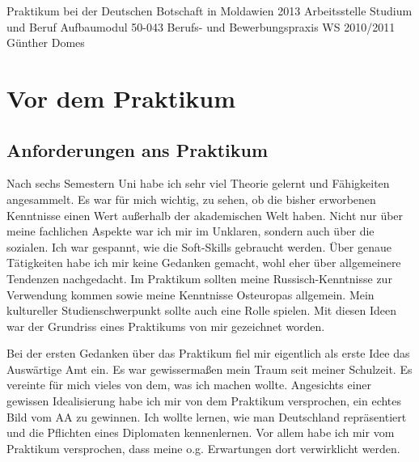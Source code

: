 \documentclass{../../sem_paper}
\begin{document}
\titlepg
{Praktikum bei der Deutschen Botschaft in Moldawien}
{2013}
{Arbeitsstelle Studium und Beruf}
{Aufbaumodul 50-043 Berufs- und Bewerbungspraxis}
{WS 2010/2011}
{Günther Domes}

\tocpaper

\section{Vor dem Praktikum}

\subsection{Anforderungen ans Praktikum}
Nach sechs Semestern Uni habe ich sehr viel Theorie gelernt und Fähigkeiten angesammelt. Es war für mich wichtig, zu sehen, ob die bisher erworbenen Kenntnisse einen Wert außerhalb der akademischen Welt haben. Nicht nur über meine fachlichen Aspekte war ich mir im Unklaren, sondern auch über die sozialen. Ich war gespannt, wie die Soft-Skills gebraucht werden.
Über genaue Tätigkeiten habe ich mir keine Gedanken gemacht, wohl eher über allgemeinere Tendenzen nachgedacht. Im Praktikum sollten meine Russisch-Kenntnisse zur Verwendung kommen sowie meine Kenntnisse Osteuropas allgemein. Mein kultureller Studienschwerpunkt sollte auch eine Rolle spielen. Mit diesen Ideen war der Grundriss eines Praktikums von mir gezeichnet worden.

Bei der ersten Gedanken über das Praktikum fiel mir eigentlich als erste Idee das Auswärtige Amt ein. Es war gewissermaßen mein Traum seit meiner Schulzeit. Es vereinte für mich vieles von dem, was ich machen wollte. Angesichts einer gewissen Idealisierung habe ich mir von dem Praktikum versprochen, ein echtes Bild vom AA zu gewinnen. Ich wollte lernen, wie man Deutschland repräsentiert und die Pflichten eines Diplomaten kennenlernen. Vor allem habe ich mir vom Praktikum versprochen, dass meine o.g. Erwartungen dort verwirklicht werden. 
\end{document}
